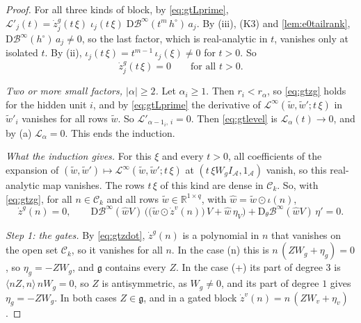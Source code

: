 \documentclass[10pt]{article}
\theoremstyle{definition}
\theoremstyle{remark}
\newcommand{\R}{\mathbb{R}}
\newcommand{\Der}{\mathrm{D}}
\begin{document}
\begin{proof}
For all three kinds of block, by \eqref{eq:gtLprime}, $\mathcal L'_j(t) = \dot z^g_j(t\,\xi)\;\iota_j(t\,\xi)\;\Der\mathcal B^\infty(t^m\,h^\circ)\,a_j$. By (iii), (K3) and \cref{lem:e0tailrank}, $\Der\mathcal B^\infty(h^\circ)\,a_j \neq 0$, so the last factor, which is real-analytic in $t$, vanishes only at isolated $t$. By (ii), $\iota_j(t\,\xi) = t^{m-1}\,\iota_j(\xi) \neq 0$ for $t > 0$. So
\begin{equation}\label{eq:gtzg}
\dot z^g_j(t\,\xi) = 0 \qquad\text{for all } t > 0 .
\end{equation}

\emph{Two or more small factors, $\lvert\alpha\rvert \ge 2$.} Let $\alpha_i \ge 1$. Then $r_i < r_\alpha$, so \eqref{eq:gtzg} holds for the hidden unit $i$, and by \eqref{eq:gtLprime} the derivative of $\mathcal L^\infty(\tilde w, \tilde w'; t\,\xi)$ in $\tilde w'_i$ vanishes for all rows $\tilde w$. So $\mathcal L'_{\alpha - 1_i,\,i} = 0$. Then \eqref{eq:gtlevel} is $\mathcal L_\alpha(t) \to 0$, and by (a) $\mathcal L_\alpha = 0$. This ends the induction.

\emph{What the induction gives.} For this $\xi$ and every $t > 0$, all coefficients of the expansion of $(\tilde w, \tilde w') \mapsto \mathcal L^\infty(\tilde w, \tilde w'; t\,\xi)$ at $(t\,\xi W_gI_{\mathcal A}, 1_{\mathcal A})$ vanish, so this real-analytic map vanishes. The rows $t\,\xi$ of this kind are dense in $\mathcal C_k$. So, with \eqref{eq:gtzg}, for all $n \in \mathcal C_k$ and all rows $\tilde w \in \R^{1\times q}$, with $\hat w = \tilde w\odot\iota(n)$,
\begin{equation}\label{eq:gtall}
\dot z^g(n) = 0, \qquad \Der\mathcal B^\infty(\hat wV)\,\Big(\big(\tilde w\odot\dot z^v(n)\big)\,V + \hat w\,\eta_V\Big) + \Der_\theta\mathcal B^\infty(\hat wV)\,\eta' = 0 .
\end{equation}

\emph{Step 1: the gates.} By \eqref{eq:gtzdot}, $\dot z^g(n)$ is a polynomial in $n$ that vanishes on the open set $\mathcal C_k$, so it vanishes for all $n$. In the case (n) this is $n\,(ZW_g + \eta_g) = 0$, so $\eta_g = -ZW_g$, and $\mathfrak g$ contains every $Z$. In the case (+) its part of degree $3$ is $\langle nZ, n\rangle\,nW_g = 0$, so $Z$ is antisymmetric, as $W_g \neq 0$, and its part of degree $1$ gives $\eta_g = -ZW_g$. In both cases $Z \in \mathfrak g$, and in a gated block $\dot z^v(n) = n\,(ZW_v + \eta_v)$.


\end{proof}
\end{document}
